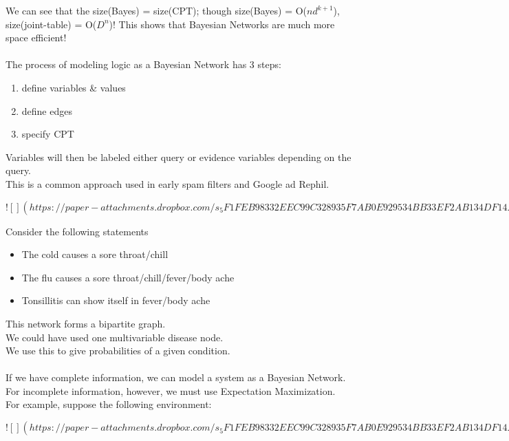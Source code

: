 \documentclass[../../lecture_notes.tex]{subfiles}
\begin{document}
\noindent We can see that the size(Bayes) = size(CPT);
	though size(Bayes) = O($nd^{k+1}$), size(joint-table) = O($D^n$)!
This shows that Bayesian Networks are much more space efficient!\\
\\
The process of modeling logic as a Bayesian Network has 3 steps:
\begin{enumerate} [itemsep=0mm]
	\item define variables \& values
	\item define edges
	\item specify CPT
\end{enumerate} 

\noindent Variables will then be labeled either query or evidence variables depending on the query.\\
This is a common approach used in early spam filters and Google ad Rephil.

\newpage
$![](https://paper-attachments.dropbox.com/s_5F1FEB98332EEC99C328935F7AB0E929534BB33EF2AB134DF14A85072ADC65A0_1590256640289_Untitled+drawing+8.jpg)$
\newpage

\noindent Consider the following statements
\begin{itemize} [itemsep=0mm]
	\item The cold causes a sore throat/chill
	\item The flu causes a sore throat/chill/fever/body ache
	\item Tonsillitis can show itself in fever/body ache
\end{itemize}
\noindent This network forms a bipartite graph.\\
We could have used one multivariable disease node.\\
We use this to give probabilities of a given condition.\\
\\
If we have complete information, we can model a system as a Bayesian Network.\\
For incomplete information, however, we must use Expectation Maximization.\\
For example, suppose the following environment:

\newpage
$![](https://paper-attachments.dropbox.com/s_5F1FEB98332EEC99C328935F7AB0E929534BB33EF2AB134DF14A85072ADC65A0_1590257642435_Untitled+drawing+9.jpg)$
\newpage
\end{document}
